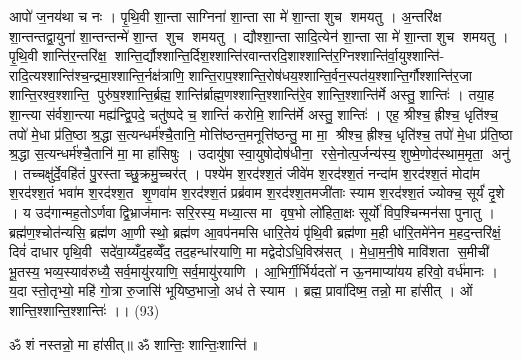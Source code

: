 आपो॑ ज॒नय॑था च नः । पृ॒थि॒वी शा॒न्ता साग्निना॑ शा॒न्ता सा मे॑ शा॒न्ता शुच शमयतु । अ॒न्तरि॑क्ष शा॒न्तन्तद्वा॒युना॑ शा॒न्तन्तन्मे॑ शा॒न्त शुच शमयतु । द्यौश्शा॒न्ता सादि॒त्येन॑ शा॒न्ता सा मे॑ शा॒न्ता शुच शमयतु । पृ॒थि॒वी शान्ति॑र॒न्तरि॑क्ष॒ शान्ति॒र्द्यौश्शान्ति॒र्दिश॒श्शान्ति॑रवान्तरदि॒शाश्शान्ति॑र॒ग्निश्शान्ति॑र्वा॒युश्शान्ति॑- रादि॒त्यश्शान्ति॑श्च॒न्द्रमा॒श्शान्ति॒र्नक्ष॑त्राणि॒ शान्ति॒राप॒श्शान्ति॒रोष॑धय॒श्शान्ति॒र्वन॒स्पत॑य॒श्शान्ति॒र्गौश्शान्ति॑र॒जा शान्ति॒रश्व॒श्शान्ति॒ पुरु॑ष॒श्शान्ति॒र्ब्रह्म॒ शान्ति॑र्ब्राह्म॒णश्शान्ति॒श्शान्ति॑रे॒व शान्ति॒श्शान्ति॑र्मे अस्तु॒ शान्तिः॑ । तया॒ह शा॒न्त्या स॑र्वशा॒न्त्या मह्य॑न्द्वि॒पदे॒ चतु॑ष्पदे च॒ शान्तिं॑ करोमि॒ शान्ति॑र्मे अस्तु॒ शान्तिः॑ । एह॒ श्रीश्च॒ ह्रीश्च॒ धृति॑श्च॒ तपो॑ मे॒धा प्र॑ति॒ष्ठा श्र॒द्धा स॒त्यन्धर्म॑श्चै॒तानि॒ मोत्ति॑ष्ठन्त॒मनूत्ति॑ष्ठन्तु॒ मा मा॒ श्रीश्च॒ ह्रीश्च॒ धृति॑श्च॒ तपो॑ मे॒धा प्र॑ति॒ष्ठा श्र॒द्धा स॒त्यन्धर्म॑श्चै॒तानि॑ मा॒ मा हा॑सिषुः । उदायु॑षा स्वा॒युषोदोष॑धीना॒ रसे॒नोत्प॒र्जन्य॑स्य॒ शुष्मे॒णोद॑स्थाम॒मृता॒ अनु॑ । तच्चक्षु॑र्दे॒वहि॑तं पु॒रस्ताच्छु॒क्रमु॒च्चर॑त् । पश्ये॑म श॒रद॑श्श॒तं जीवे॑म श॒रद॑श्श॒तं नन्दा॑म श॒रद॑श्श॒तं मोदा॑म श॒रद॑श्श॒तं भवा॑म श॒रद॑श्श॒त शृ॒णवा॑म श॒रद॑श्श॒तं प्रब्र॑वाम श॒रद॑श्श॒तमजी॑ताः स्याम श॒रद॑श्श॒तं ज्योक्च॒ सूर्यं॑ दृ॒शे । य उद॑गान्मह॒तोऽर्णवाद्वि॒भ्राज॑मानः सरि॒रस्य॒ मध्या॒त्स मा वृष॒भो लो॑हिता॒क्षः सूर्यो॑ विप॒श्चिन्मन॑सा पुनातु । ब्रह्म॑ण॒श्चोत॑न्यसि॒ ब्रह्म॑ण आ॒णी स्थो॒ ब्रह्म॑ण आ॒वप॑नमसि धारि॒तेयं पृ॑थि॒वी ब्रह्म॑णा म॒ही धा॑रि॒तमे॑नेन म॒हद॒न्तरि॑क्षं॒ दिवं॑ दाधार पृथि॒वी सदे॑वा॒य्यँद॒हव्वेँद॒ तद॒हन्धा॑रयाणि॒ मा मद्वेदोऽधि॒विस्र॑सत् । मे॒धा॒म॒नी॒षे मावि॑शता स॒मीची॑ भू॒तस्य॒ भव्य॒स्याव॑रुध्यै॒ सर्व॒मायु॑रयाणि॒ सर्व॒मायु॑रयाणि । आ॒भिर्गी॒र्भिर्यदतो॑ न ऊ॒नमाप्या॑यय हरिवो॒ वर्ध॑मानः । य॒दा स्तो॒तृभ्यो॒ महि॑ गो॒त्रा रु॒जासि॑ भूयिष्ठ॒भाजो॒ अध॑ ते स्याम । ब्रह्म॒ प्रावा॑दिष्म॒ तन्नो॒ मा हा॑सीत् । ओं शान्ति॒श्शान्ति॒श्शान्तिः॑ ।। (93)

\setcounter{anuvakam}{0}

ॐ शं नस्तन्नो॒ मा हा॑सीत्॥ ॐ शान्तिः॒ शान्तिः॒शान्ति॑॥

